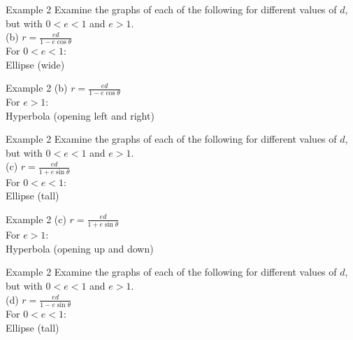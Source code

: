 \documentclass[t,usenames,dvipsnames]{beamer}
\begin{document}
\begin{frame}{Example 2}
Examine the graphs of each of the following for different values of $d$, but with $0 < e < 1$ and $e > 1$.  \newline\\ 
(b) \quad   $r = \frac{ed}{1-e\cos\theta}$  \newline\\  \pause
For $0 < e < 1$:    \pause  \newline\\

Ellipse (wide)
\end{frame}

\begin{frame}{Example 2}
(b) \quad   $r = \frac{ed}{1-e\cos\theta}$  \newline\\  \pause
For $e > 1$:    \pause  \newline\\

Hyperbola (opening left and right)
\end{frame}


\begin{frame}{Example 2}
Examine the graphs of each of the following for different values of $d$, but with $0 < e < 1$ and $e > 1$.  \newline\\ 
(c) \quad   $r = \frac{ed}{1+e\sin\theta}$  \newline\\  \pause
For $0 < e < 1$:    \pause  \newline\\
Ellipse (tall)
\end{frame}

\begin{frame}{Example 2}
(c) \quad   $r = \frac{ed}{1+e\sin\theta}$  \newline\\  \pause
For $e > 1$:    \pause  \newline\\

Hyperbola (opening up and down)
\end{frame}

\begin{frame}{Example 2}
Examine the graphs of each of the following for different values of $d$, but with $0 < e < 1$ and $e > 1$.  \newline\\ 
(d) \quad   $r = \frac{ed}{1-e\sin\theta}$  \newline\\  \pause
For $0 < e < 1$:    \pause  \newline\\

Ellipse (tall)
\end{frame}
\end{document}
